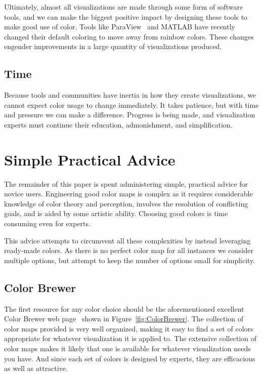 \documentclass[letterpaper,twocolumn,fleqn]{article}
\newcommand*{\lcite}[1]{~\cite{#1}}
\begin{document}
Ultimately, almost all visualizations are made through some form of
software tools, and we can make the biggest positive impact by designing
these tools to make good use of color. Tools like ParaView\lcite{ParaView}
and MATLAB have recently changed their default coloring to move away from
rainbow colors. These changes engender improvements in a large quantity of
visualizations produced.

\subsection{Time}

\noindent
Because tools and communities have inertia in how they create
visualizations, we cannot expect color usage to change immediately. It
takes patience, but with time and pressure we can make a difference.
Progress is being made, and visualization experts must continue their
education, admonishment, and simplification.


\section{Simple Practical Advice}

\noindent
The remainder of this paper is spent administering simple, practical advice
for novice users. Engineering good color maps is complex as it requires
considerable knowledge of color theory and perception, involves the
resolution of conflicting goals, and is aided by some artistic ability.
Choosing good colors is time consuming even for experts.

This advice attempts to circumvent all these complexities by instead
leveraging ready-made colors. As there is no perfect color map for all
instances we consider multiple options, but attempt to keep the number of
options small for simplicity.

\subsection{Color Brewer}

\noindent
The first resource for any color choice should be the aforementioned
excellent Color Brewer web page\lcite{ColorBrewerURL} shown in
Figure~\ref{fig:ColorBrewer}. The collection of color maps provided is very
well organized, making it easy to find a set of colors appropriate for
whatever visualization it is applied to. The extensive collection of color
maps makes it likely that one is available for whatever visualization needs
you have. And since each set of colors is designed by experts, they are
efficacious as well as attractive.
\end{document}
